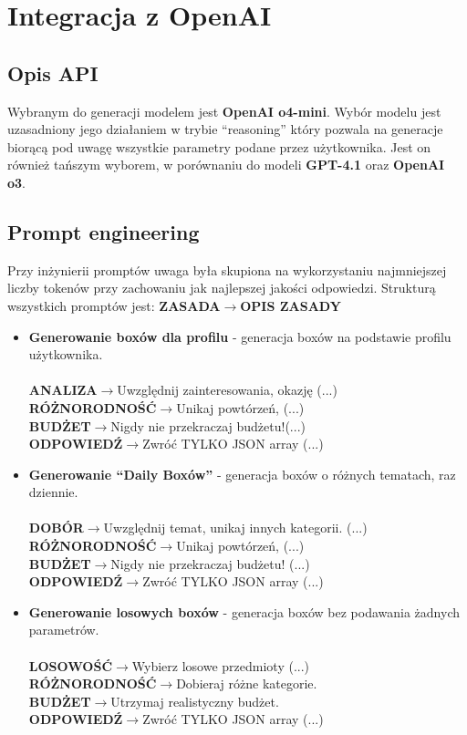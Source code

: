 \documentclass[a4paper, 12pt]{article}
\begin{document}
\section{Integracja z OpenAI}
\subsection{Opis API}
Wybranym do generacji modelem jest \textbf{OpenAI o4-mini}.
Wybór modelu jest uzasadniony
jego działaniem w trybie ``reasoning'' który pozwala na generacje biorącą pod
uwagę wszystkie parametry podane przez użytkownika.
Jest on również tańszym wyborem, w porównaniu do modeli \textbf{GPT-4.1} oraz \textbf{OpenAI o3}.
\subsection{Prompt engineering}
Przy inżynierii promptów uwaga była skupiona na wykorzystaniu najmniejszej liczby tokenów przy zachowaniu jak najlepszej jakości odpowiedzi.
Strukturą wszystkich promptów jest:
\textbf{ZASADA}$\rightarrow$\textbf{OPIS ZASADY}
\begin{itemize}
    \item \textbf{Generowanie boxów dla profilu} - generacja boxów na podstawie profilu użytkownika.\\\\
        \textbf{ANALIZA}$\rightarrow$Uwzględnij zainteresowania, okazję (...) \\
        \textbf{RÓŻNORODNOŚĆ}$\rightarrow$Unikaj powtórzeń, (...) \\
        \textbf{BUDŻET}$\rightarrow$Nigdy nie przekraczaj budżetu!(...) \\
        \textbf{ODPOWIEDŹ}$\rightarrow$Zwróć TYLKO JSON array (...) \\
    \item \textbf{Generowanie ``Daily Boxów''} - generacja boxów o różnych tematach, raz dziennie.\\\\
        \textbf{DOBÓR}$\rightarrow$Uwzględnij temat, unikaj innych kategorii. (...) \\
        \textbf{RÓŻNORODNOŚĆ}$\rightarrow$Unikaj powtórzeń,  (...) \\
        \textbf{BUDŻET}$\rightarrow$Nigdy nie przekraczaj budżetu!  (...) \\
        \textbf{ODPOWIEDŹ}$\rightarrow$Zwróć TYLKO JSON array  (...) \\
    \item \textbf{Generowanie losowych boxów} - generacja boxów bez podawania żadnych parametrów.\\\\
        \textbf{LOSOWOŚĆ}$\rightarrow$Wybierz losowe przedmioty (...) \\
        \textbf{RÓŻNORODNOŚĆ}$\rightarrow$Dobieraj różne kategorie. \\
        \textbf{BUDŻET}$\rightarrow$Utrzymaj realistyczny budżet.\\
        \textbf{ODPOWIEDŹ}$\rightarrow$Zwróć TYLKO JSON array (...) \\
\end{itemize}
\end{document}
